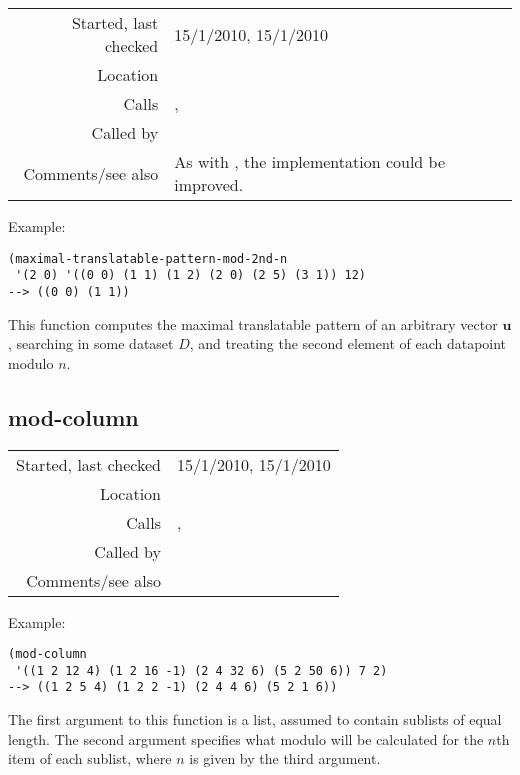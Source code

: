 \vspace{0.3cm}
\begin{tabular}{r|p{8cm}}
Started, last checked & 15/1/2010, 15/1/2010 \\
Location & \nameref{sec:structural-induction-mod} \\
Calls & \nameref{fun:add-two-lists-mod-2nd-n}, \nameref{fun:test-equal<list-elements} \\
Called by & \\
Comments/see also & As with \nameref{fun:maximal-translatable-pattern}, the implementation could be improved.
\end{tabular}

\vspace{0.5cm}
\noindent Example:
\begin{verbatim}
(maximal-translatable-pattern-mod-2nd-n
 '(2 0) '((0 0) (1 1) (1 2) (2 0) (2 5) (3 1)) 12)
--> ((0 0) (1 1))
\end{verbatim}

\noindent This function computes the maximal
translatable pattern of an arbitrary vector
$\mathbf{u}$, searching in some dataset $D$, and
treating the second element of each datapoint modulo
$n$.


\subsection*{mod-column}\label{fun:mod-column}

\vspace{0.3cm}
\begin{tabular}{r|p{8cm}}
Started, last checked & 15/1/2010, 15/1/2010 \\
Location & \nameref{sec:structural-induction-mod} \\
Calls & \nameref{fun:firstn}, \nameref{fun:lastn} \\
Called by & \nameref{fun:test-translation-mod-2nd-n-no-length-check} \\
Comments/see also &
\end{tabular}

\vspace{0.5cm}
\noindent Example:
\begin{verbatim}
(mod-column
 '((1 2 12 4) (1 2 16 -1) (2 4 32 6) (5 2 50 6)) 7 2)
--> ((1 2 5 4) (1 2 2 -1) (2 4 4 6) (5 2 1 6))
\end{verbatim}

\noindent The first argument to this function is a
list, assumed to contain sublists of equal length. The
second argument specifies what modulo will be
calculated for the $n$th item of each sublist, where
$n$ is given by the third argument.


